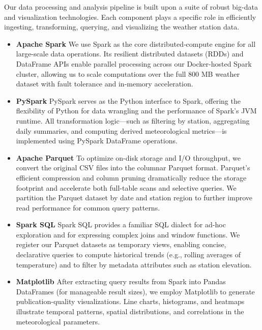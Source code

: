 Our data processing and analysis pipeline is built upon a suite of robust big-data and visualization technologies. Each component plays a specific role in efficiently ingesting, transforming, querying, and visualizing the weather station data.

\begin{itemize}
  \item \textbf{Apache Spark}
    We use Spark as the core distributed‐compute engine for all large-scale data operations. Its resilient distributed datasets (RDDs) and DataFrame APIs enable parallel processing across our Docker-hosted Spark cluster, allowing us to scale computations over the full 800 MB weather dataset with fault tolerance and in-memory acceleration.

  \item \textbf{PySpark}
    PySpark serves as the Python interface to Spark, offering the flexibility of Python for data wrangling and the performance of Spark’s JVM runtime. All transformation logic—such as filtering by station, aggregating daily summaries, and computing derived meteorological metrics—is implemented using PySpark DataFrame operations.

  \item \textbf{Apache Parquet}
    To optimize on-disk storage and I/O throughput, we convert the original CSV files into the columnar Parquet format. Parquet’s efficient compression and column pruning dramatically reduce the storage footprint and accelerate both full-table scans and selective queries. We partition the Parquet dataset by date and station region to further improve read performance for common query patterns.

  \item \textbf{Spark SQL}
    Spark SQL provides a familiar SQL dialect for ad-hoc exploration and for expressing complex joins and window functions. We register our Parquet datasets as temporary views, enabling concise, declarative queries to compute historical trends (e.g., rolling averages of temperature) and to filter by metadata attributes such as station elevation.

  \item \textbf{Matplotlib}
    After extracting query results from Spark into Pandas DataFrames (for manageable result sizes), we employ Matplotlib to generate publication-quality visualizations. Line charts, histograms, and heatmaps illustrate temporal patterns, spatial distributions, and correlations in the meteorological parameters.
\end{itemize}
